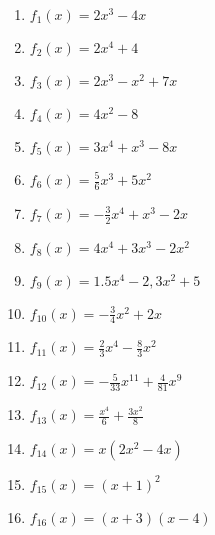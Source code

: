 \begin{minipage}{\textwidth}
	\begin{Exercise}[title={\raggedright Berechne jeweils allgemein die Ableitung \(f'(x)\)}, label=summenregelA1]
		\begin{minipage}{\textwidth}
			\begin{minipage}{0.49\textwidth}
				\begin{enumerate}[label=\alph*)]
					\item \(f_1(x)=2x^3-4x\)
					\item \(f_2(x)=2x^4+4\)
					\item \(f_3(x)=2x^3-x^2+7x\)
					\item \(f_4(x)=4x^2-8\)
					\item \(f_5(x)=3x^4+x^3-8x\)
					\item \(f_6(x)=\frac{5}{6}x^3+5x^2\)
					\item \(f_7(x)=-\frac{3}{2}x^4+x^3-2x\)
					\item \(f_8(x)=4x^4+3x^3-2x^2\)
				\end{enumerate}
			\end{minipage}
			\begin{minipage}{0.49\textwidth}
				\begin{enumerate}[label=\alph*)]
					\setcounter{enumi}{8}
					\item \(f_9(x)=1.5x^4-2,3x^2+5\)
					\item \(f_{10}(x)=-\frac{3}{4}x^2+2x\)
					\item \(f_{11}(x)=\frac{2}{3}x^4-\frac{8}{3}x^2\)
					\item \(f_{12}(x)=-\frac{5}{33}x^{11}+\frac{4}{81}x^9\)
					\item \(f_{13}(x)=\frac{x^4}{6}+\frac{3x^2}{8}\)
					\item \(f_{14}(x)=x(2x^2-4x)\)
					\item \(f_{15}(x)=(x+1)^2\)
					\item \(f_{16}(x)=(x+3)(x-4)\)
				\end{enumerate}
			\end{minipage}
		\end{minipage}
	\end{Exercise}
\end{minipage}
